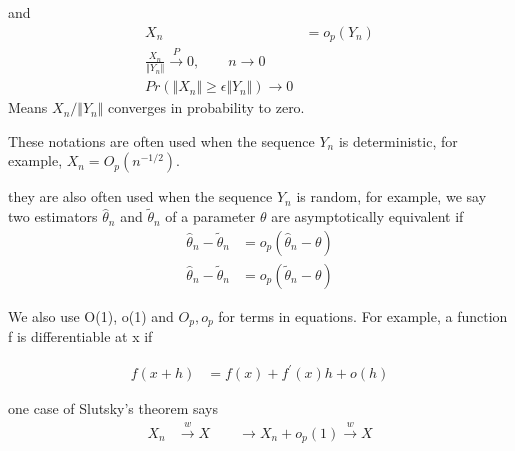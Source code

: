 and
\begin{align*}
	X_n &= o_p(Y_n) \\
	\frac{X_n}{\Vert Y_n \Vert} \xrightarrow{P} 0, \qquad n \rightarrow 0 \\
	Pr(\Vert X_n \Vert \geq \epsilon \Vert Y_n \Vert) \rightarrow 0
\end{align*}
Means $X_n/ \Vert Y_n \Vert $ converges in probability to zero.

These notations are often used when the sequence $Y_n$ is deterministic, for example, $X_n = O_p(n^{-1/2})$. 

they are also often used when the sequence $Y_n$ is random, for example, we say two estimators $\hat{\theta}_n$ and $\tilde{\theta}_n$ of a parameter $\theta$ are asymptotically equivalent if 
\begin{align*}
	\hat{\theta}_n - \tilde{\theta}_n&= o_p(\hat{\theta}_n - {\theta}) \\
	\hat{\theta}_n - \tilde{\theta}_n&= o_p(\tilde{\theta}_n - {\theta}) 
\end{align*}

We also use O(1), o(1) and $O_p, o_p$ for terms in equations. For example, a function f is differentiable at x if

\begin{align*}
	f(x + h) &= f(x) + f^{'}(x) h + o(h) 
\end{align*}

one case of Slutsky's theorem says
\begin{align*}
	X_n & \xrightarrow {w} X \qquad \rightarrow X_n + o_p(1) \xrightarrow{w} X
\end{align*}

